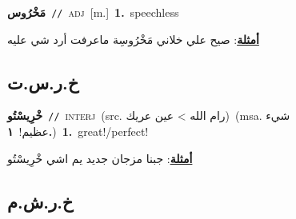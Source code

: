 \documentclass[10pt,a4paper,twoside]{article} %
\begin{document}
\begin{multicols}{2}
{\setlength\topsep{0pt}\textbf{\foreignlanguage{arabic}{مَخْرُوس}}\ {\color{gray}\texttt{//}\color{black}}\ \textsc{adj}\ [m.]\ \textbf{1.}~speechless\  \begin{flushright}\color{gray}\foreignlanguage{arabic}{\textbf{\underline{\foreignlanguage{arabic}{أمثلة}}}: صيح علي خلاني مَخْرُوسِة ماعرفت أرد شي عليه}\end{flushright}\color{black}} \vspace{2mm}

\vspace{-3mm}
\subsection*{\color{blue}\foreignlanguage{arabic}{خ.ر.س.ت}\color{blue}{ (ntws)}} 

{\setlength\topsep{0pt}\textbf{\foreignlanguage{arabic}{خْرِيسْتُو}}\ {\color{gray}\texttt{//}\color{black}}\ \textsc{interj}\ (src. \color{gray}\foreignlanguage{arabic}{رام الله > عين عريك}\color{black})\ \color{gray}(msa. \foreignlanguage{arabic}{شيء عظيم!}~\foreignlanguage{arabic}{\textbf{١.}})\color{black}\ \textbf{1.}~great!/perfect!\  \begin{flushright}\color{gray}\foreignlanguage{arabic}{\textbf{\underline{\foreignlanguage{arabic}{أمثلة}}}: جبنا مزجان جديد يم اشي خْرِيسْتُو}\end{flushright}\color{black}} \vspace{2mm}

\vspace{-3mm}
\subsection*{\color{blue}\foreignlanguage{arabic}{خ.ر.ش.م}\color{blue}{}} 


\end{multicols}
\end{document}
